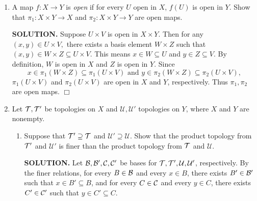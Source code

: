 \documentclass{article}
\begin{document}
\begin{enumerate}
    {\bf SOLUTION.} $A = (-1, -\frac12) \cup (\frac12, 1)$ is the union of two open intervals, hence it is open in $\reals.$ Since $A \cap Y = A$, $A$ is open in $Y$.

    $B = [-1, -\frac12) \cup (\frac12, 1]$ is not open in $\reals$, but it is open in $Y$ because $B' = (-2, -\frac12) \cup (\frac12, 2)$ is open in $\reals$ and $B = B' \cap Y$.

    $C = (-1, -\frac12] \cup [\frac12, 1)$ is not open in $\reals$, and not open in $Y$.

    $D = [-1, -\frac12] \cup [\frac12, 1]$ is open in neither $\reals$ nor $Y$.

    $E = (-1, 0) \cup (0, 1) - K = (-1, 0) \cup \bigcup_{n \in \nats} (\frac{1}{n+1}, \frac1n)$ is open in $\reals$, and $E \cap Y = E$, so it is open in $Y$. $\Box$
    
    \item A map $f: X \rightarrow Y$ is {\it open} if for every $U$ open in $X$, $f(U)$ is open in $Y$. Show that $\pi_1: X \times Y \rightarrow X$ and $\pi_2 : X \times Y \rightarrow Y$ are open maps.

    {\bf SOLUTION.} Suppose $U \times V$ is open in $X \times Y$. Then for any $(x, y) \in U \times V,$ there exists a basis element $W \times Z$ such that $(x, y) \in W \times Z \subseteq U \times V$. This means $x \in W \subseteq U$ and $y \in Z \subseteq V$. By definition, $W$ is open in $X$ and $Z$ is open in $Y$. Since
    $$x \in \pi_1(W \times Z) \subseteq \pi_1(U \times V) \text{ and } y \in \pi_2(W \times Z) \subseteq \pi_2(U \times V),$$
    $\pi_1(U \times V)$ and $\pi_2(U \times V)$ are open in $X$ and $Y$, respectively. Thus $\pi_1, \pi_2$ are open maps. $\Box$

    \item Let $\mathcal{T}, \mathcal{T}'$ be topologies on $X$ and $\mathcal{U}, \mathcal{U}'$ topologies on $Y$, where $X$ and $Y$ are nonempty.
    \begin{enumerate}
        \item Suppose that $\mathcal{T}' \supseteq \mathcal{T}$ and $\mathcal{U}' \supseteq \mathcal{U}$. Show that the product topology from $\mathcal{T}'$ and $\mathcal{U}'$ is finer than the product topology from $\mathcal{T}$ and $\mathcal{U}$.

        {\bf SOLUTION.} Let $\mathcal{B}, \mathcal{B}', \mathcal{C}, \mathcal{C}'$ be bases for $\mathcal{T}, \mathcal{T}', \mathcal{U}, \mathcal{U}'$, respectively. By the finer relations, for every $B \in \mathcal{B}$ and every $x \in B$, there exists $B' \in \mathcal{B}'$ such that $x \in B' \subseteq B$, and for every $C \in \mathcal{C}$ and every $y \in C$, there exists $C' \in \mathcal{C}'$ such that $y \in C' \subseteq C$.


\end{enumerate}
\end{enumerate}
\end{document}
